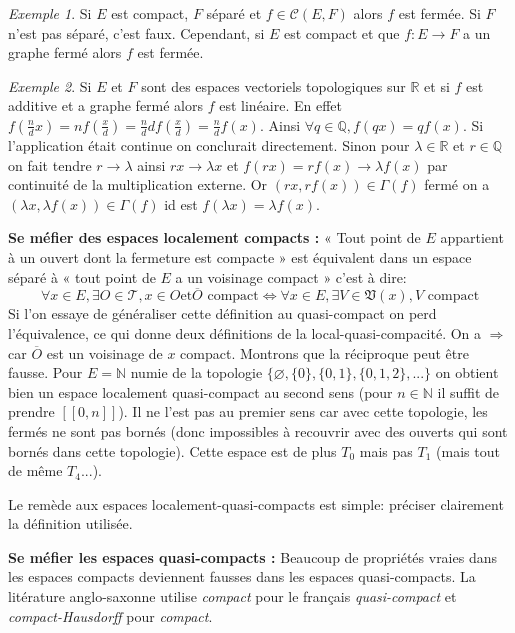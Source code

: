 \documentclass[a4paper, 11pt, french]{book}
\theoremstyle{plain} %
\theoremstyle{definition} %
\theoremstyle{remark} %
\newtheorem{exemple}{Exemple}
\newcommand{\1}{\mathds{1}}
\newcommand\vide{\varnothing}
\newcommand{\et}{\mathrel{\mathrm{et}}}
\newcommand{\N}{\mathbb{N}}
\newcommand{\Q}{\mathbb{Q}}
\newcommand{\R}{\mathbb{R}}
\renewcommand{\cal}[1]{\mathcal{#1}}
\renewcommand{\frak}[1]{\mathfrak{#1}}
\newcommand{\scr}[1]{\mathscr{#1}}
\newcommand\intervalle[1]{[\![#1]\!]}
\begin{document}
\begin{exemple}
	Si $E$ est compact, $F$ séparé et $f\in\cal{C}(E, F)$ alors $f$ est fermée.
	Si $F$ n'est pas séparé, c'est faux.
	Cependant, si $E$ est compact et que $f:E\rightarrow F$ a un graphe fermé alors $f$ est fermée.
\end{exemple}

\begin{exemple}
	Si $E$ et $F$ sont des espaces vectoriels topologiques sur $\R$ et si $f$ est additive et a graphe fermé alors $f$ est linéaire.
	En effet $f(\frac{n}{d}x)=nf(\frac{x}{d})=\frac{n}{d}df(\frac{x}{d})=\frac{n}{d}f(x)$.
	Ainsi $\forall q\in\Q, f(qx)=qf(x)$.
	Si l'application était continue on conclurait directement.
	Sinon pour $\lambda\in\R$ et $r\in\Q$ on fait tendre $r\rightarrow\lambda$ ainsi $rx\rightarrow\lambda x$ et $f(rx)=rf(x)\rightarrow\lambda f(x)$ par continuité de la multiplication externe.
	Or $(rx, rf(x))\in\Gamma(f)$ fermé on a $(\lambda x, \lambda f(x))\in\Gamma(f)$ id est $f(\lambda x)=\lambda f(x)$.
\end{exemple}

\textbf{Se méfier des espaces localement compacts :}
« Tout point de $E$ appartient à un ouvert dont la fermeture est compacte » est équivalent dans un espace séparé à « tout point de $E$ a un voisinage compact » c'est à dire:
$$
	\forall x\in E, \exists O\in\scr{T}, x\in O\et\overline{O}\text{ compact}
	\iff
	\forall x\in E, \exists V\in\frak{V}(x), V\text{ compact}
$$
Si l'on essaye de généraliser cette définition au quasi-compact on perd l'équivalence, ce qui donne deux définitions de la local-quasi-compacité.
On a $\Rightarrow$ car $\overline{O}$ est un voisinage de $x$ compact.
Montrons que la réciproque peut être fausse.
Pour $E=\N$ numie de la topologie $\{\vide, \{0\}, \{0, 1\}, \{0, 1, 2\}, ...\}$ on obtient bien un espace localement quasi-compact au second sens (pour $n\in\N$ il suffit de prendre $\intervalle{0, n}$).
Il ne l'est pas au premier sens car avec cette topologie, les fermés ne sont pas bornés (donc impossibles à recouvrir avec des ouverts qui sont bornés dans cette topologie).
Cette espace est de plus $T_0$ mais pas $T_1$ (mais tout de même $T_4$...).

Le remède aux espaces localement-quasi-compacts est simple: préciser clairement la définition utilisée.

\textbf{Se méfier les espaces quasi-compacts :}
Beaucoup de propriétés vraies dans les espaces compacts deviennent fausses dans les espaces quasi-compacts.
La litérature anglo-saxonne utilise \textit{compact} pour le français \textit{quasi-compact} et \textit{compact-Hausdorff} pour \textit{compact}.
\end{document}
